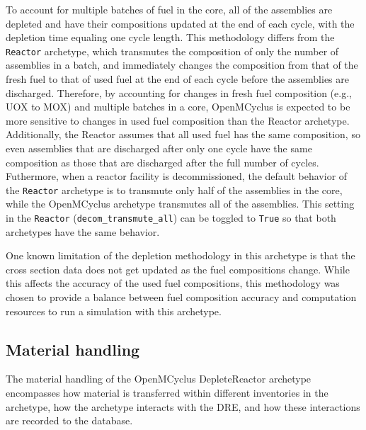 To account for multiple batches of fuel in the core, all of the assemblies 
are depleted and have their compositions updated 
at the end of each cycle, with the depletion time equaling one cycle 
length. This methodology differs from the \Cycamore 
\texttt{Reactor} archetype, which transmutes the composition of only the 
number of 
assemblies in a batch, and immediately changes the composition from that 
of the fresh fuel to that of used fuel at the end of each cycle before the 
assemblies are discharged. Therefore, by accounting for 
changes in fresh fuel composition (e.g., UOX to MOX) and multiple 
batches in a core, OpenMCyclus is expected to be more sensitive to 
changes in used fuel composition than the \Cycamore Reactor archetype. 
Additionally, the \Cycamore Reactor assumes that all used fuel has the 
same composition, so even assemblies that are discharged after only one 
cycle have the same composition as those that are discharged after the
full number of cycles.
Futhermore, when a reactor facility is decommissioned, the default behavior 
of the \Cycamore \texttt{Reactor} archetype is to transmute only half of the 
assemblies in the core, while the OpenMCyclus archetype transmutes all of 
the assemblies. This setting in the \Cycamore \texttt{Reactor} 
(\texttt{decom\_transmute\_all}) can be toggled to \texttt{True} so that 
both archetypes have the same behavior.

One known limitation of the depletion methodology in this archetype 
is that the cross section data does not get updated as the 
fuel compositions change. While this affects the accuracy of the 
used fuel compositions, this methodology was chosen to provide 
a balance between fuel composition accuracy and computation 
resources to run a simulation with this archetype. 

\subsection{Material handling}
The material handling of the OpenMCyclus DepleteReactor archetype 
encompasses how material is transferred within different inventories 
in the archetype, how the archetype interacts with the \gls{DRE}, 
and how these interactions are recorded to the database. 

